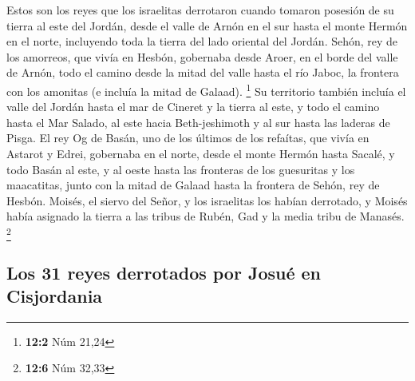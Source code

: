  Estos son los reyes que los israelitas derrotaron cuando
tomaron posesión de su tierra al este del Jordán, desde el valle de
Arnón en el sur hasta el monte Hermón en el norte, incluyendo toda la
tierra del lado oriental del Jordán.  Sehón, rey de los
amorreos, que vivía en Hesbón, gobernaba desde Aroer, en el borde del
valle de Arnón, todo el camino desde la mitad del valle hasta el río
Jaboc, la frontera con los amonitas (e incluía la mitad de Galaad).
\footnote{\textbf{12:2} Núm 21,24}  Su territorio también
incluía el valle del Jordán hasta el mar de Cineret y la tierra al este,
y todo el camino hasta el Mar Salado, al este hacia Beth-jeshimoth y al
sur hasta las laderas de Pisga.  El rey Og de Basán, uno
de los últimos de los refaítas, que vivía en Astarot y Edrei,
 gobernaba en el norte, desde el monte Hermón hasta
Sacalé, y todo Basán al este, y al oeste hasta las fronteras de los
guesuritas y los maacatitas, junto con la mitad de Galaad hasta la
frontera de Sehón, rey de Hesbón.  Moisés, el siervo del
Señor, y los israelitas los habían derrotado, y Moisés había asignado la
tierra a las tribus de Rubén, Gad y la media tribu de Manasés.
\footnote{\textbf{12:6} Núm 32,33}

\hypertarget{los-31-reyes-derrotados-por-josuuxe9-en-cisjordania}{%
\subsection{Los 31 reyes derrotados por Josué en
Cisjordania}\label{los-31-reyes-derrotados-por-josuuxe9-en-cisjordania}}

